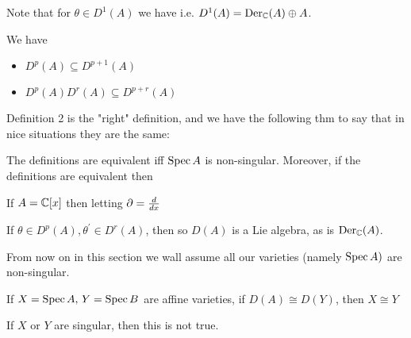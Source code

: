\documentclass{article}
\begin{document}
\begin{remark}
Note that for $\theta \in D^1(A)$ we have 
i.e. $D^1(A) = \operatorname{Der}_{\mathbb{C}}(A) \oplus A$. 
\end{remark}

\begin{prop}
We have 
\begin{itemize}
    \item $D^p(A) \subseteq D^{p+1}(A)$
    \item $D^p(A) D^r(A) \subseteq D^{p+r}(A)$
\end{itemize}
\end{prop}

Definition 2 is the "right" definition, and we have the following thm to say that in nice situations they are the same:

\begin{theorem}[Grothendieck]
The definitions are equivalent iff $\operatorname{Spec} A$ is non-singular. Moreover, if the definitions are equivalent then 
\end{theorem}

\begin{example}
If $A = \mathbb{C}[x]$ then letting $\partial = \frac{d}{dx}$
\end{example}

\begin{fact}
If $\theta \in D^p(A), \theta^\prime \in D^r(A)$, then 
so $D(A)$ is a Lie algebra, as is $\operatorname{Der}_{\mathbb{C}}(A)$. 
\end{fact}

From now on in this section we wall assume all our varieties (namely $\operatorname{Spec} A)$ are non-singular. 

\begin{conjecture}
If $X= \operatorname{Spec} A, \, Y = \operatorname{Spec} B$ are affine varieties, if $D(A) \cong D(Y)$, then $X \cong Y$
\end{conjecture}
\begin{remark}
If $X$ or $Y$ are singular, then this is not true. 
\end{remark}

\subsection{}
\end{document}
